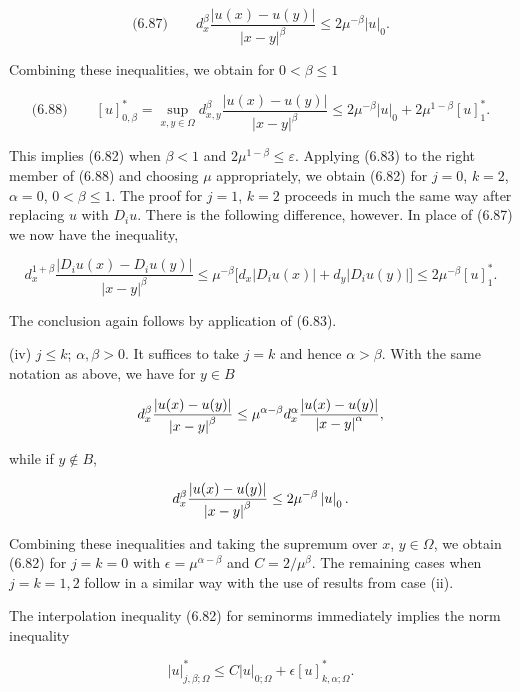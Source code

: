 \[
\text{(6.87)}\qquad d_x^{\beta}\frac{\lvert u(x)-u(y)\rvert}{\lvert x-y\rvert^{\beta}}\le 2\mu^{-\beta}\lvert u\rvert_{0}.
\]

Combining these inequalities, we obtain for $0<\beta\le 1$

\[
\text{(6.88)}\qquad [u]^*_{0,\beta}=\sup_{x,y\in\Omega}d_{x,y}^{\beta}\frac{\lvert u(x)-u(y)\rvert}{\lvert x-y\rvert^{\beta}}
\le 2\mu^{-\beta}\lvert u\rvert_{0}+2\mu^{1-\beta}[u]^*_{1}.
\]

This implies (6.82) when $\beta<1$ and $2\mu^{1-\beta}\le \varepsilon$. Applying (6.83) to the right member of (6.88) and choosing $\mu$ appropriately, we obtain (6.82) for $j=0$, $k=2$, $\alpha=0$, $0<\beta\le 1$. The proof for $j=1$, $k=2$ proceeds in much the same way after replacing $u$ with $D_i u$. There is the following difference, however. In place of (6.87) we now have the inequality,

\[
d_x^{1+\beta}\frac{\lvert D_i u(x)-D_i u(y)\rvert}{\lvert x-y\rvert^{\beta}}
\le \mu^{-\beta}\bigl[d_x\lvert D_i u(x)\rvert+d_y\lvert D_i u(y)\rvert\bigr]\le 2\mu^{-\beta}[u]^*_{1}.
\]




The conclusion again follows by application of (6.83).

\medskip

\noindent (iv) $j\leq k$; $\alpha,\beta>0$. It suffices to take $j=k$ and hence $\alpha>\beta$. With the same notation as above, we have for $y\in B$

\[
d_x^{\beta}\frac{\left|u(x)-u(y)\right|}{\left|x-y\right|^{\beta}}\leq \mu^{\alpha-\beta}d_x^{\alpha}\frac{\left|u(x)-u(y)\right|}{\left|x-y\right|^{\alpha}},
\]

\noindent while if $y\notin B$,

\[
d_x^{\beta}\frac{\left|u(x)-u(y)\right|}{\left|x-y\right|^{\beta}}\leq 2\mu^{-\beta}\left|u\right|_{0}.
\]

Combining these inequalities and taking the supremum over $x$, $y\in\Omega$, we obtain
(6.82) for $j=k=0$ with $\epsilon=\mu^{\alpha-\beta}$ and $C=2/\mu^{\beta}$. The remaining cases when $j=k=1,2$
follow in a similar way with the use of results from case (ii).

The interpolation inequality (6.82) for seminorms immediately implies the norm
inequality

\[
\lvert u\rvert^*_{j,\beta;\Omega}\leq C\lvert u\rvert_{0;\Omega}+\epsilon [u]^*_{k,\alpha;\Omega}.
\]

